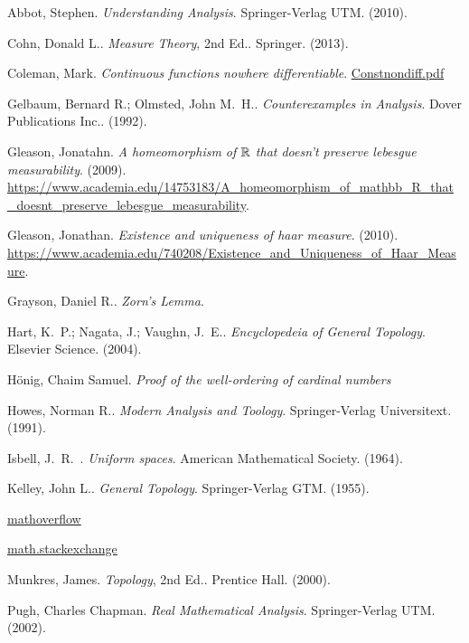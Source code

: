 \begin{thebibliography}{9}

Abbot, Stephen.  \textit{Understanding Analysis}.  Springer-Verlag UTM.  (2010).

Cohn, Donald L..  \textit{Measure Theory}, 2nd Ed..  Springer.  (2013).

Coleman, Mark.  \textit{Continuous functions nowhere differentiable}.  \href{http://www.maths.manchester.ac.uk/~mdc/MATH20101/notesPermanant/Contsnondiff.pdf}{Constnondiff.pdf}

Gelbaum, Bernard R.; Olmsted, John M.~H..  \textit{Counterexamples in Analysis}.  Dover Publications Inc..  (1992).

Gleason, Jonatahn.  \textit{A homeomorphism of $\mathbb{R}$ that doesn't preserve lebesgue measurability}.  (2009).  \url{https://www.academia.edu/14753183/A_homeomorphism_of_mathbb_R_that_doesnt_preserve_lebesgue_measurability}.

Gleason, Jonathan.  \textit{Existence and uniqueness of haar measure}.  (2010).  \url{https://www.academia.edu/740208/Existence_and_Uniqueness_of_Haar_Measure}.

Grayson, Daniel R..  \textit{Zorn's Lemma}.

Hart, K.~P.; Nagata, J.; Vaughn, J.~E..  \textit{Encyclopedeia of General Topology}.  Elsevier Science.  (2004).

H\"{o}nig, Chaim Samuel.  \textit{Proof of the well-ordering of cardinal numbers}

Howes, Norman R..  \textit{Modern Analysis and Toology}.  Springer-Verlag Universitext.  (1991).

Isbell, J.~R.~.  \textit{Uniform spaces}.  American Mathematical Society.  (1964).

Kelley, John L..  \textit{General Topology}.  Springer-Verlag GTM.  (1955).

\href{http://mathoverflow.net/}{mathoverflow}

\href{http://math.stackexchange.com/}{math.stackexchange}

Munkres, James.  \textit{Topology}, 2nd Ed..  Prentice Hall.  (2000).

Pugh, Charles Chapman.  \textit{Real Mathematical Analysis}.  Springer-Verlag UTM.  (2002).


\end{thebibliography}
